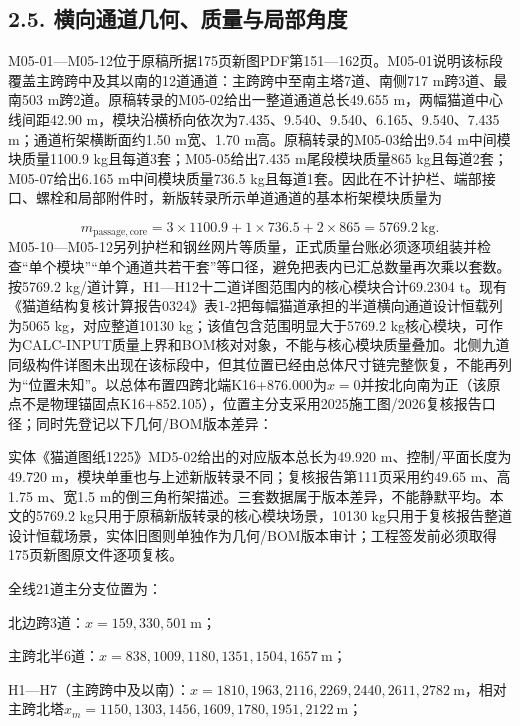 \documentclass[UTF8,a4paper,11pt,fontset=none]{ctexart}
\begin{document}
\subsection*{2.5. 横向通道几何、质量与局部角度}
M05-01—M05-12位于原稿所据175页新图PDF第151—162页。M05-01说明该标段覆盖主跨跨中及其以南的12道通道：主跨跨中至南主塔7道、南侧717 m跨3道、最南503 m跨2道。原稿转录的M05-02给出一整道通道总长49.655 m，两幅猫道中心线间距42.90 m，模块沿横桥向依次为7.435、9.540、9.540、6.165、9.540、7.435 m；通道桁架横断面约1.50 m宽、1.70 m高。原稿转录的M05-03给出9.54 m中间模块质量1100.9 kg且每道3套；M05-05给出7.435 m尾段模块质量865 kg且每道2套；M05-07给出6.165 m中间模块质量736.5 kg且每道1套。因此在不计护栏、端部接口、螺栓和局部附件时，新版转录所示单道通道的基本桁架模块质量为\par
\[
m_{\mathrm{passage,core}}
=3\times1100.9+1\times736.5+2\times865
=5769.2\ \mathrm{kg}.
\]
M05-10—M05-12另列护栏和钢丝网片等质量，正式质量台账必须逐项组装并检查“单个模块”“单个通道共若干套”等口径，避免把表内已汇总数量再次乘以套数。按5769.2 kg/道计算，H1—H12十二道详图范围内的核心模块合计69.2304 t。现有《猫道结构复核计算报告0324》表1-2把每幅猫道承担的半道横向通道设计恒载列为5065 kg，对应整道10130 kg；该值包含范围明显大于5769.2 kg核心模块，可作为CALC-INPUT质量上界和BOM核对对象，不能与核心模块质量叠加。北侧九道同级构件详图未出现在该标段中，但其位置已经由总体尺寸链完整恢复，不能再列为“位置未知”。以总体布置四跨北端K16+876.000为\(x=0\)\allowbreak{}并按北向南为正（该原点不是物理锚固点K16+852.105），位置主分支采用2025施工图/2026复核报告口径；同时先登记以下几何/BOM版本差异：\par
实体《猫道图纸1225》MD5-02给出的对应版本总长为49.920 m、控制/平面长度为49.720 m，模块单重也与上述新版转录不同；复核报告第111页采用约49.65 m、高1.75 m、宽1.5 m的倒三角桁架描述。三套数据属于版本差异，不能静默平均。本文的5769.2 kg只用于原稿新版转录的核心模块场景，10130 kg只用于复核报告整道设计恒载场景，实体旧图则单独作为几何/BOM版本审计；工程签发前必须取得175页新图原文件逐项复核。\par
全线21道主分支位置为：\par
北边跨3道：\(x=159,\allowbreak 330,\allowbreak 501\ \mathrm m\)\allowbreak{}；\par
主跨北半6道：\(x=838,\allowbreak 1009,\allowbreak 1180,\allowbreak 1351,\allowbreak 1504,\allowbreak 1657\ \mathrm m\)\allowbreak{}；\par
H1—H7（主跨跨中及以南）：\(x=1810,\allowbreak 1963,\allowbreak 2116,\allowbreak 2269,\allowbreak 2440,\allowbreak 2611,\allowbreak 2782\ \mathrm m\)\allowbreak{}，相对主跨北塔\(x_m=1150,\allowbreak 1303,\allowbreak 1456,\allowbreak 1609,\allowbreak 1780,\allowbreak 1951,\allowbreak 2122\ \mathrm m\)\allowbreak{}；\par
\end{document}
